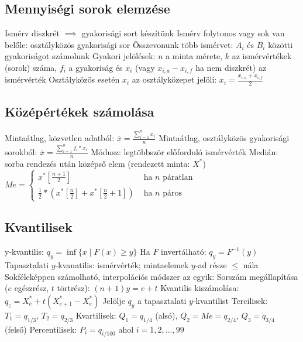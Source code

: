 \documentclass[12pt,a4paper]{article}
\begin{document}
\subsection{Mennyiségi sorok elemzése}

\begin{outline}
	\1 Ismérv diszkrét $\implies$ gyakorisági sort készítünk
	\1 Ismérv folytonos vagy sok van belőle: osztályközös gyakorisági sor
		\2 Összevonunk több ismérvet: $A_i$ és $B_i$ közötti gyakoriságot számolunk
	\1 Gyakori jelölések: $n$ a minta mérete, $k$ az ismérvértékek (sorok) száma, $f_i$ a gyakoriság és $x_i$ (vagy $x_{i,a} - x_{i,f}$ ha nem diszkrét) az ismérvérték
		\2 Osztályközös esetén $x_i$ az osztályközepet jelöli: $x_i = \frac{x_{i,a} + x_{i,f}}{2}$
\end{outline}

\subsection{Középértékek számolása}

\begin{outline}
	\1 Mintaátlag, közvetlen adatból: $\overline{x} = \frac{\sum_{i=1}^{n} x_i}{n}$
	\1 Mintaátlag, osztályközös gyakorisági sorokból: $\overline{x} = \frac{\sum_{i=1}^{n} f_i*x_i}{n}$
	\1 Módusz: legtöbbször előforduló ismérvérték
	\1 Medián: sorba rendezés után középső elem (rendezett minta: $X^*$)
		\2 $Me = \begin{cases}
		x^*[\frac{n+1}{2}] & \text{ ha $n$ páratlan}\\
		\frac{1}{2}*(x^*[\frac{n}{2}] + x^*[\frac{n}{2}+1]) & \text{ ha $n$ páros}
		\end{cases}$
\end{outline}

\pagebreak

\subsection{Kvantilisek}

\begin{outline}
	\1 y-kvantilis: $q_y = \inf\{ x \;|\; F(x) \ge y \}$
		\2 Ha $F$ invertálható: $q_y = F^{-1}(y)$
	\1 Tapasztalati $y$-kvanatilis: ismérvérték; mintaelemek $y$-ad része $\le$ nála
		\2 Sokféleképpen számolható, interpolációs módszer az egyik:
		\2 Sorszám megállapítása ($e$ egészrész, $t$ törtrész): $(n+1)y=e+t$
		\2 Kvantilis kiszámolása: $q_z = X^*_e + t(X^*_{e+1} - X^*_e)$
	\1 Jelölje $q_y$ a tapasztalati $y$-kvantilist
	\1 Tercilisek: $T_1 = q_{1/3}$, $T_2 = q_{2/3}$
	\1 Kvartilisek: $Q_1 = q_{1/4}$ (alsó), $Q_2 = Me = q_{2/4}$, $Q_3 = q_{3/4}$ (felső)
	\1 Percentilisek: $P_i = q_{i/100}$ ahol $i = 1,2,...,99$
\end{outline}
\end{document}
